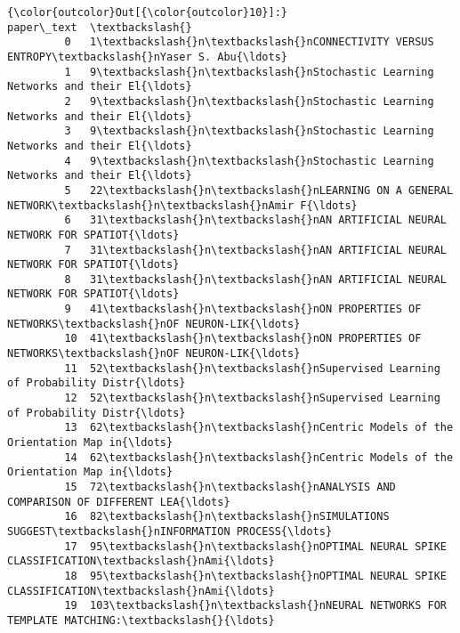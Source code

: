 \documentclass[11pt]{article}
\begin{document}
\begin{Verbatim}[commandchars=\\\{\}]
{\color{outcolor}Out[{\color{outcolor}10}]:}                                            paper\_text  \textbackslash{}
         0   1\textbackslash{}n\textbackslash{}nCONNECTIVITY VERSUS ENTROPY\textbackslash{}nYaser S. Abu{\ldots}   
         1   9\textbackslash{}n\textbackslash{}nStochastic Learning Networks and their El{\ldots}   
         2   9\textbackslash{}n\textbackslash{}nStochastic Learning Networks and their El{\ldots}   
         3   9\textbackslash{}n\textbackslash{}nStochastic Learning Networks and their El{\ldots}   
         4   9\textbackslash{}n\textbackslash{}nStochastic Learning Networks and their El{\ldots}   
         5   22\textbackslash{}n\textbackslash{}nLEARNING ON A GENERAL NETWORK\textbackslash{}n\textbackslash{}nAmir F{\ldots}   
         6   31\textbackslash{}n\textbackslash{}nAN ARTIFICIAL NEURAL NETWORK FOR SPATIOT{\ldots}   
         7   31\textbackslash{}n\textbackslash{}nAN ARTIFICIAL NEURAL NETWORK FOR SPATIOT{\ldots}   
         8   31\textbackslash{}n\textbackslash{}nAN ARTIFICIAL NEURAL NETWORK FOR SPATIOT{\ldots}   
         9   41\textbackslash{}n\textbackslash{}nON PROPERTIES OF NETWORKS\textbackslash{}nOF NEURON-LIK{\ldots}   
         10  41\textbackslash{}n\textbackslash{}nON PROPERTIES OF NETWORKS\textbackslash{}nOF NEURON-LIK{\ldots}   
         11  52\textbackslash{}n\textbackslash{}nSupervised Learning of Probability Distr{\ldots}   
         12  52\textbackslash{}n\textbackslash{}nSupervised Learning of Probability Distr{\ldots}   
         13  62\textbackslash{}n\textbackslash{}nCentric Models of the Orientation Map in{\ldots}   
         14  62\textbackslash{}n\textbackslash{}nCentric Models of the Orientation Map in{\ldots}   
         15  72\textbackslash{}n\textbackslash{}nANALYSIS AND COMPARISON OF DIFFERENT LEA{\ldots}   
         16  82\textbackslash{}n\textbackslash{}nSIMULATIONS SUGGEST\textbackslash{}nINFORMATION PROCESS{\ldots}   
         17  95\textbackslash{}n\textbackslash{}nOPTIMAL NEURAL SPIKE CLASSIFICATION\textbackslash{}nAmi{\ldots}   
         18  95\textbackslash{}n\textbackslash{}nOPTIMAL NEURAL SPIKE CLASSIFICATION\textbackslash{}nAmi{\ldots}   
         19  103\textbackslash{}n\textbackslash{}nNEURAL NETWORKS FOR TEMPLATE MATCHING:\textbackslash{}{\ldots}   
         

\end{Verbatim}
\end{document}
